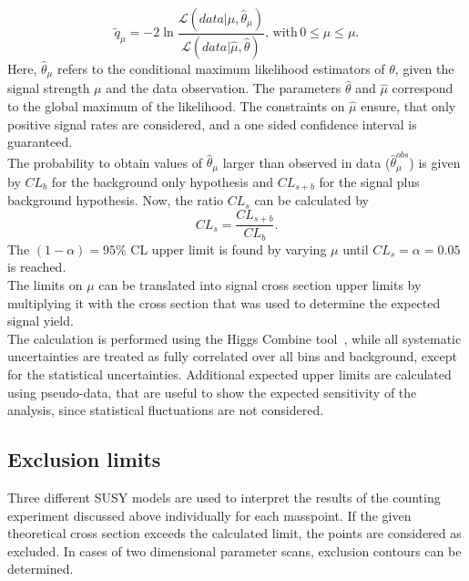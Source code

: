 \begin{equation}
 \tilde{q}_{\mu}= -2 \ln \frac{\mathcal{L}(data|\mu,\hat{\theta}_{\mu})}{\mathcal{L}(data|\hat{\mu},\hat{\theta})}, \,\mathrm{with}\,0\leq\hat{\mu}\leq\mu.
\end{equation}
Here, $\hat{\theta}_{\mu}$ refers to the conditional maximum likelihood estimators of $\theta$, given the signal strength $\mu$ and the data observation. The parameters $\hat{\theta}$ and $\hat{\mu}$ correspond to the global maximum of the likelihood. The constraints on $\hat{\mu}$ ensure, that only positive signal rates are considered, and a one sided confidence interval is guaranteed.\\
The probability to obtain values of $\hat{\theta}_{\mu}$ larger than observed in data ($\hat{\theta}_{\mu}^{obs}$) is given by $CL_b$ for the background only hypothesis and $CL_{s+b}$ for the signal plus background hypothesis. Now, the ratio $CL_s$ can be calculated by
\begin{equation}
 CL_s=\frac{CL_{s+b}}{CL_b}.
\end{equation}
The $(1-\alpha)=95\%$ CL upper limit is found by varying $\mu$ until $CL_s = \alpha=0.05$ is reached.\\
The limits on $\mu$ can be translated into signal cross section upper limits by multiplying it with the cross section that was used to determine the expected signal yield.\\
The calculation is performed using the Higgs Combine tool~\cite{CLS3}, while all systematic uncertainties are treated as fully correlated over all bins and background, except for the statistical uncertainties.
Additional expected upper limits are calculated using pseudo-data, that are useful to show the expected sensitivity of the analysis, since statistical fluctuations are not considered.

\newpage
\subsection{Exclusion limits}
Three different SUSY models are used to interpret the results of the counting experiment discussed above individually for each masspoint. If the given theoretical cross section exceeds the calculated limit, the points are considered as excluded. In cases of two dimensional parameter scans, exclusion contours can be determined.


